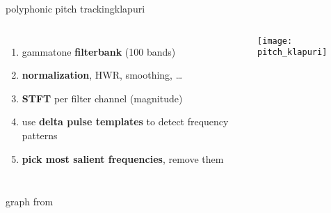 	\begin{frame}{polyphonic pitch tracking}{klapuri}
        \begin{columns}[T]
                \begin{enumerate}
                    \item	gammatone \textbf{filterbank} (100 bands)
                    \item<2->	\textbf{normalization}, HWR, smoothing, \ldots
                    \item<3->	\textbf{STFT} per filter channel (magnitude)
                    \item<4->	use \textbf{delta pulse templates} to detect frequency patterns
                    \item<5->	\textbf{pick most salient frequencies}, remove them
                \end{enumerate}
                \texttt{[image: pitch\_klapuri]}
        \end{columns}
    \bigskip
    
    \begin{flushright}
        graph from 
    \end{flushright}
	\end{frame}
    
